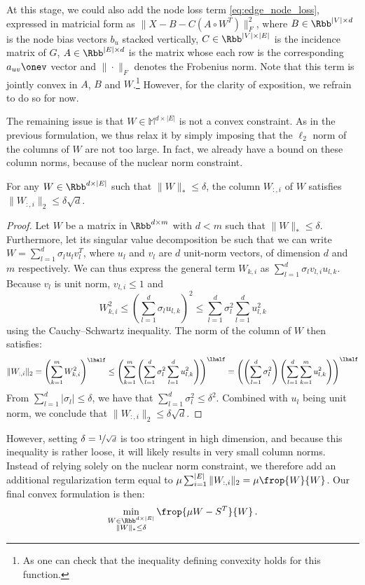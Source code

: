 At this stage, we could also add the node loss term \eqref{eq:edge_node_loss}, expressed in matricial
form as $\|X - B -
C\left(A\circ W^T \right)\|_F^2$, where $B\in \Rbb^{|V| \times d}$ is the node bias vectors $b_u$
stacked vertically, $C \in \Rbb^{|V| \times |E|}$ is the incidence matrix of $G$, $A \in \Rbb^{|E|
\times d}$ is the matrix whose each row is the corresponding $a_{uv}\onev$ vector and $\|\cdot\|_F$
denotes the Frobenius norm. Note that this term is jointly convex in $A$, $B$ and $W$.\footnote{As
one can check that the inequality defining convexity holds for this function.} However, for the
clarity of exposition, we refrain to do so for now.

The remaining issue is that $W\in \mathbb{M}^{d\times |E|}$ is not a convex constraint. As in the
previous formulation, we thus relax it by simply imposing that the $\ell_2$ norm of the columns of
$W$ are not too large. In fact, we already have a bound on these column norms, because of the
nuclear norm constraint.
\begin{prop}
For any $W\in \Rbb^{d\times |E|}$ such that $\|W\|_* \leq \delta$, the \ith{} column $W_{:,i}$ of
$W$ satisfies $\|W_{:,i}\|_2 \leq \delta\sqrt{d}$.
\end{prop}
\begin{proof}
  Let $W$ be a matrix in $\Rbb^{d\times m}$ with $d < m$ such that $\|W\|_* \leq \delta$.
  Furthermore, let its singular value decomposition be such that we can write $W = \sum_{l=1}^d
  \sigma_l u_l v_l^T$, where $u_l$ and $v_l$ are $d$ unit-norm vectors, of dimension $d$ and $m$
  respectively. We can thus express the general term $W_{k,i}$ as $\sum_{l=1}^d \sigma_l v_{l,i}
  u_{l,k}$. Because $v_l$ is unit norm, $v_{l,i} \leq 1$ and $$W_{k,i}^2 \leq \left( \sum_{l=1}^d
  \sigma_l u_{l,k} \right)^2 \leq \sum_{l=1}^d \sigma_l^2 \sum_{l=1}^d u_{l,k}^2$$ using the
  Cauchy--Schwartz inequality. The norm of the \ith{} column of $W$ then satisfies:
  \begin{equation*}
    \|W_{:,i}\|_2 = \left( \sum_{k=1}^m W_{k,i}^2 \right)^\lhalf
    \leq \left( \sum_{k=1}^m \left( \sum_{l=1}^d \sigma_l^2 \sum_{l=1}^d u_{l,k}^2 \right) \right)^\lhalf
    = \left( \left( \sum_{l=1}^d \sigma_l^2 \right) \left( \sum_{l=1}^d \sum_{k=1}^m u_{l,k}^2 \right) \right)^\lhalf
  \end{equation*}
  From $\sum_{l=1}^d |\sigma_l | \leq \delta$, we have that $\sum_{l=1}^d \sigma_l^2 \leq \delta^2$.
  Combined with $u_l$ being unit norm, we conclude that $\|W_{:,i}\|_2 \leq \delta\sqrt{d}$.
\end{proof}
However, setting $\delta = \nicefrac{1}{\sqrt{d}}$ is too stringent in high dimension, and because
this inequality is rather loose, it will likely results in very small column norms. Instead of
relying solely on the nuclear norm constraint, we therefore add an additional regularization term
equal to $\mu \sum_{i=1}^{|E|} \|W_{:,i}\|_2 = \mu \frop{W}{W}$. Our final convex formulation is
then:
\begin{equation}
  \label{eq:edge_FW}
  \min_{\substack{W\in \Rbb^{d\times |E|} \\ \|W\|_* \leq \delta}} \frop{\mu W - S^T}{W} \,.
\end{equation}

